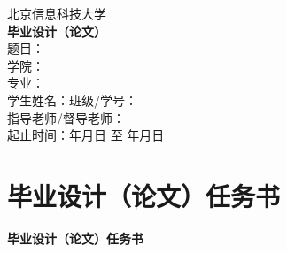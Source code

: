 \documentclass[a4paper,12pt]{ctexart}
\newcommand{\yihao}{\fontsize{26pt}{39pt}\selectfont}      %
\newcommand{\xiaochu}{\fontsize{36pt}{54pt}\selectfont}    %
\newcommand{\sanhao}{\fontsize{16pt}{24pt}\selectfont}     %
\newcommand{\sihao}{\fontsize{14pt}{21pt}\selectfont}      %
\begin{document}
\begin{titlepage}
    \centering
    \vspace*{2cm}
    
    {\yihao\kaishu 北京信息科技大学}\\[3cm]
    
    {\xiaochu\kaishu\bfseries 毕业设计（论文）}\\[4cm]
    
    {\sihao\songti
    题\quad 目：\underline{\hspace{8cm}}\\[1cm]
    
    学\quad 院：\underline{\hspace{8cm}}\\[1cm]
    
    专\quad 业：\underline{\hspace{8cm}}\\[1cm]
    
    学生姓名：\underline{\hspace{4cm}}班级/学号：\underline{\hspace{4cm}}\\[1cm]
    
    指导老师/督导老师：\underline{\hspace{8cm}}\\[1cm]
    
    起止时间：\underline{\hspace{2cm}}年\underline{\hspace{2cm}}月\underline{\hspace{2cm}}日 至 
    \underline{\hspace{2cm}}年\underline{\hspace{2cm}}月\underline{\hspace{2cm}}日
    }
    
    \vfill
\end{titlepage}

\section*{毕业设计（论文）任务书}
\thispagestyle{empty}
\begin{center}
    \heiti\sanhao\bfseries 毕业设计（论文）任务书
\end{center}
\vspace{2em}
\end{document}
